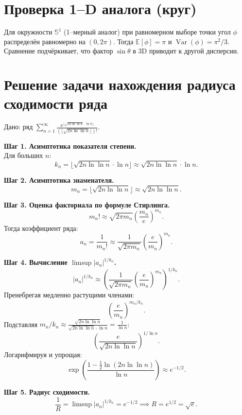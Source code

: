 \documentclass{article}
\begin{document}
\section*{Проверка 1--D аналога (круг)}

Для окружности $\mathbb S^{1}$ (1--мерный аналог) при равномерном выборе точки
угол $\phi$ распределён равномерно на $(0,2\pi)$.
Тогда $\mathbb E[\phi]=\pi$ и $\operatorname{Var}(\phi)=\pi^{2}/3$.
Сравнение подчёркивает, что фактор $\sin\theta$ в 3D приводит к другой дисперсии.



\section*{Решение задачи нахождения радиуса сходимости ряда}

Дано: ряд \(\sum_{n=1}^\infty \frac{x^{\lfloor \sqrt{2n \ln \ln n} \cdot \ln n \rfloor}}{(\lfloor \sqrt{2n \ln \ln n} \rfloor)!}\).

\textbf{Шаг 1. Асимптотика показателя степени.}\\
Для больших \(n\):
\[
k_n = \lfloor \sqrt{2n \ln \ln n} \cdot \ln n \rfloor \approx \sqrt{2n \ln \ln n} \cdot \ln n.
\]

\textbf{Шаг 2. Асимптотика знаменателя.}\\
\[
m_n = \lfloor \sqrt{2n \ln \ln n} \rfloor \approx \sqrt{2n \ln \ln n}.
\]

\textbf{Шаг 3. Оценка факториала по формуле Стирлинга.}\\
\[
m_n! \approx \sqrt{2\pi m_n} \left(\frac{m_n}{e}\right)^{m_n}.
\]
Тогда коэффициент ряда:
\[
a_n = \frac{1}{m_n!} \approx \frac{1}{\sqrt{2\pi m_n}} \left(\frac{e}{m_n}\right)^{m_n}.
\]

\textbf{Шаг 4. Вычисление \(\limsup |a_n|^{1/k_n}\).}\\
\[
|a_n|^{1/k_n} \approx \left( \frac{1}{\sqrt{2\pi m_n}} \left(\frac{e}{m_n}\right)^{m_n} \right)^{1/k_n}.
\]
Пренебрегая медленно растущими членами:
\[
\left(\frac{e}{m_n}\right)^{m_n/k_n}.
\]
Подставляя \(m_n/k_n \approx \frac{\sqrt{2n \ln \ln n}}{\sqrt{2n \ln \ln n} \cdot \ln n} = \frac{1}{\ln n}\):
\[
\left(\frac{e}{\sqrt{2n \ln \ln n}}\right)^{1/\ln n}.
\]
Логарифмируя и упрощая:
\[
\exp\left( \frac{1 - \frac{1}{2} \ln(2n \ln \ln n)}{\ln n} \right) \approx e^{-1/2}.
\]

\textbf{Шаг 5. Радиус сходимости.}\\
\[
\frac{1}{R} = \limsup |a_n|^{1/k_n} = e^{-1/2} \implies R = e^{1/2} = \sqrt{e}.
\]
\end{document}
